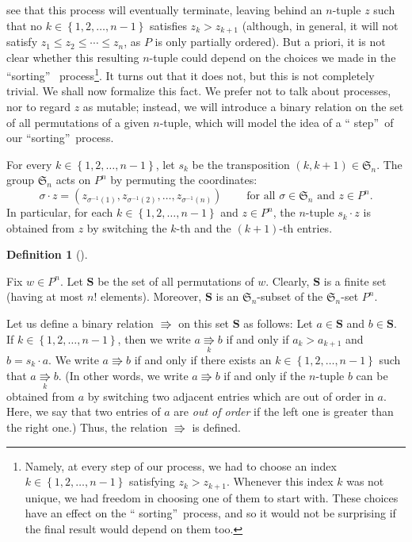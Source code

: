 \documentclass[numbers=enddot,12pt,final,onecolumn,notitlepage]{scrartcl}%
\theoremstyle{definition}
\newtheorem{defi}[theo]{Definition}
\newenvironment{definition}[1][]
{\begin{defi}[#1]\begin{leftbar}}
{\end{leftbar}\end{defi}}
\begin{document}
see that this process will eventually terminate, leaving behind an $n$-tuple
$z$ such that no $k\in\left\{  1,2,\ldots,n-1\right\}  $ satisfies
$z_{k}>z_{k+1}$ (although, in general, it will not satisfy $z_{1}\leq
z_{2}\leq\cdots\leq z_{n}$, as $P$ is only partially ordered). But a priori,
it is not clear whether this resulting $n$-tuple could depend on the choices
we made in the \textquotedblleft sorting\textquotedblright%
\ process\footnote{Namely, at every step of our process, we had to choose an
index $k\in\left\{  1,2,\ldots,n-1\right\}  $ satisfying $z_{k}>z_{k+1}$.
Whenever this index $k$ was not unique, we had freedom in choosing one of them
to start with. These choices have an effect on the \textquotedblleft
sorting\textquotedblright\ process, and so it would not be surprising if the
final result would depend on them too.}. It turns out that it does not, but
this is not completely trivial. We shall now formalize this fact. We prefer
not to talk about processes, nor to regard $z$ as mutable; instead, we will
introduce a binary relation on the set of all permutations of a given
$n$-tuple, which will model the idea of a \textquotedblleft
step\textquotedblright\ of our \textquotedblleft sorting\textquotedblright\ process.

For every $k\in\left\{  1,2,\ldots,n-1\right\}  $, let $s_{k}$ be the
transposition $\left(  k,k+1\right)  \in\mathfrak{S}_{n}$. The group
$\mathfrak{S}_{n}$ acts on $P^{n}$ by permuting the coordinates:%
\[
\sigma\cdot z=\left(  z_{\sigma^{-1}\left(  1\right)  },z_{\sigma^{-1}\left(
2\right)  },\ldots,z_{\sigma^{-1}\left(  n\right)  }\right)
\ \ \ \ \ \ \ \ \ \ \text{for all }\sigma\in\mathfrak{S}_{n}\text{ and }z\in
P^{n}.
\]
In particular, for each $k\in\left\{  1,2,\ldots,n-1\right\}  $ and $z\in
P^{n}$, the $n$-tuple $s_{k}\cdot z$ is obtained from $z$ by switching the
$k$-th and the $\left(  k+1\right)  $-th entries.

\begin{definition}
Fix $w\in P^{n}$. Let $\mathbf{S}$ be the set of all permutations of $w$.
Clearly, $\mathbf{S}$ is a finite set (having at most $n!$ elements).
Moreover, $\mathbf{S}$ is an $\mathfrak{S}_{n}$-subset of the $\mathfrak{S}%
_{n}$-set $P^{n}$.

Let us define a binary relation $\Rrightarrow$ on this set $\mathbf{S}$ as
follows: Let $a\in\mathbf{S}$ and $b\in\mathbf{S}$. If $k\in\left\{
1,2,\ldots,n-1\right\}  $, then we write $a\underset{k}{\Rrightarrow}b$ if and
only if $a_{k}>a_{k+1}$ and $b=s_{k}\cdot a$. We write $a\Rrightarrow b$ if
and only if there exists an $k\in\left\{  1,2,\ldots,n-1\right\}  $ such that
$a\underset{k}{\Rrightarrow}b$. (In other words, we write $a\Rrightarrow b$ if
and only if the $n$-tuple $b$ can be obtained from $a$ by switching two
adjacent entries which are out of order in $a$. Here, we say that two entries
of $a$ are \textit{out of order} if the left one is greater than the right
one.) Thus, the relation $\Rrightarrow$ is defined.
\end{definition}
\end{document}
